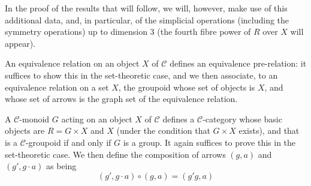   In the proof of the results that will follow, we will, however, make use of this additional data, and, in particular, of the simplicial operations (including the symmetry operations) up to dimension \(3\) (the fourth fibre power of \(R\) over \(X\) will appear).\par{}An equivalence relation on an object \(X\) of \(\mathcal {C}\) defines an equivalence pre-relation: it suffices to show this in the set-theoretic case, and we then associate, to an equivalence relation on a set \(X\), the groupoid whose set of objects is \(X\), and whose set of arrows is the graph set of the equivalence relation.\par{}A \(\mathcal {C}\)-monoid \(G\) acting on an object \(X\) of \(\mathcal {C}\) defines a \(\mathcal {C}\)-category whose basic objects are \(R=G\times  X\) and \(X\) (under the condition that \(G\times  X\) exists), and that is a \(\mathcal {C}\)-groupoid if and only if \(G\) is a group.
  It again suffices to prove this in the set-theoretic case.
  We then define the composition of arrows \((g,a)\) and \((g',g\cdot  a)\) as being
  \[     (g',g\cdot  a) \circ  (g,a)     = (g'g,a)   \]
